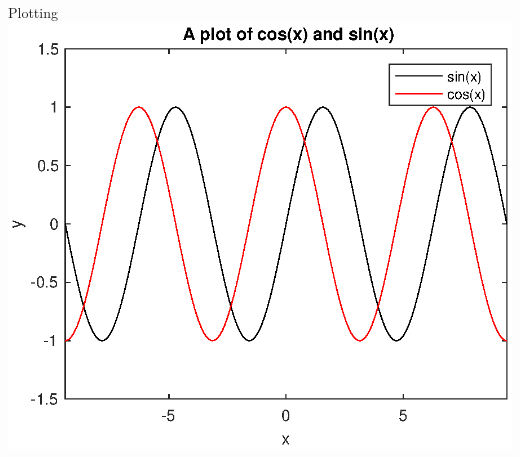 \documentclass[8pt]{extarticle}
\begin{document}
\begin{multicols}{2}
\begin{exampleBlock}{Plotting}
            \includegraphics[width=0.4\paperwidth]{plotting.eps}
        \end{exampleBlock}
        
    \end{multicols}
    
\end{document}
